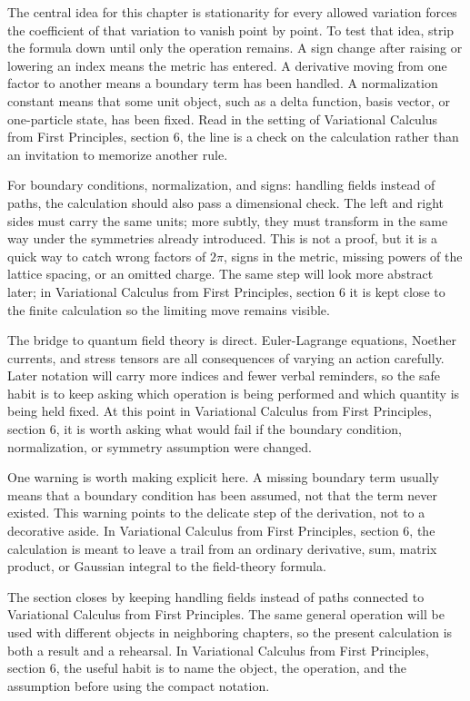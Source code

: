 The central idea for this chapter is stationarity for every allowed variation forces the coefficient of that variation to vanish point by point.  To test that idea, strip the formula down until only the operation remains.  A sign change after raising or lowering an index means the metric has entered.  A derivative moving from one factor to another means a boundary term has been handled.  A normalization constant means that some unit object, such as a delta function, basis vector, or one-particle state, has been fixed.  Read in the setting of Variational Calculus from First Principles, section 6, the line is a check on the calculation rather than an invitation to memorize another rule.

For boundary conditions, normalization, and signs: handling fields instead of paths, the calculation should also pass a dimensional check.  The left and right sides must carry the same units; more subtly, they must transform in the same way under the symmetries already introduced.  This is not a proof, but it is a quick way to catch wrong factors of \(2\pi\), signs in the metric, missing powers of the lattice spacing, or an omitted charge.  The same step will look more abstract later; in Variational Calculus from First Principles, section 6 it is kept close to the finite calculation so the limiting move remains visible.

The bridge to quantum field theory is direct.  Euler-Lagrange equations, Noether currents, and stress tensors are all consequences of varying an action carefully.  Later notation will carry more indices and fewer verbal reminders, so the safe habit is to keep asking which operation is being performed and which quantity is being held fixed.  At this point in Variational Calculus from First Principles, section 6, it is worth asking what would fail if the boundary condition, normalization, or symmetry assumption were changed.

One warning is worth making explicit here.  A missing boundary term usually means that a boundary condition has been assumed, not that the term never existed.  This warning points to the delicate step of the derivation, not to a decorative aside.  In Variational Calculus from First Principles, section 6, the calculation is meant to leave a trail from an ordinary derivative, sum, matrix product, or Gaussian integral to the field-theory formula.

The section closes by keeping handling fields instead of paths connected to Variational Calculus from First Principles.  The same general operation will be used with different objects in neighboring chapters, so the present calculation is both a result and a rehearsal.  In Variational Calculus from First Principles, section 6, the useful habit is to name the object, the operation, and the assumption before using the compact notation.



